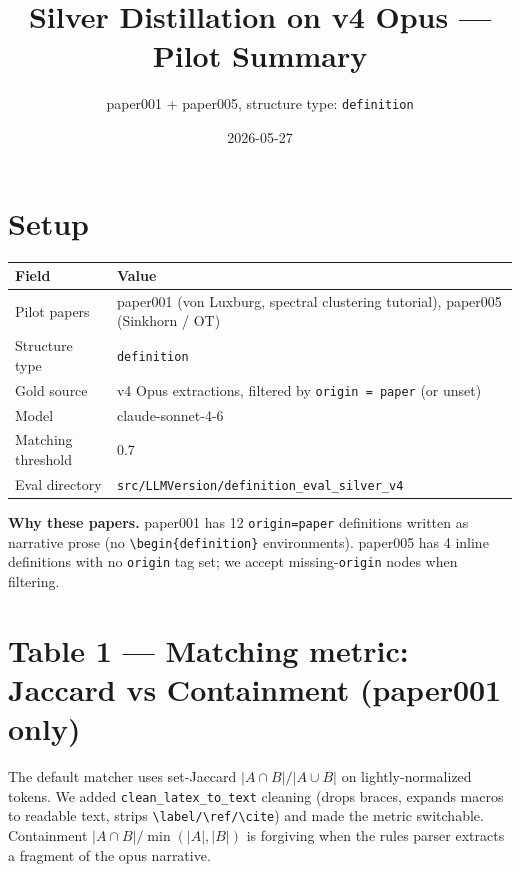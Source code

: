 \documentclass[10pt]{article}
\title{\vspace{-2em}Silver Distillation on v4 Opus --- Pilot Summary}
\author{paper001 + paper005, structure type: \texttt{definition}}
\date{2026-05-27}
\begin{document}
\maketitle
\vspace{-1.5em}

\section*{Setup}
\noindent
\begin{tabular}{ll}
\toprule
\textbf{Field} & \textbf{Value} \\
\midrule
Pilot papers       & paper001 (von Luxburg, spectral clustering tutorial), paper005 (Sinkhorn / OT) \\
Structure type     & \texttt{definition} \\
Gold source        & v4 Opus extractions, filtered by \texttt{origin = paper} (or unset) \\
Model              & claude-sonnet-4-6 \\
Matching threshold & 0.7 \\
Eval directory     & \texttt{src/LLMVersion/definition\_eval\_silver\_v4} \\
\bottomrule
\end{tabular}

\bigskip
\noindent
{\small \textbf{Why these papers.} paper001 has 12 \texttt{origin=paper} definitions written as narrative prose (no \texttt{\textbackslash begin\{definition\}} environments). paper005 has 4 inline definitions with no \texttt{origin} tag set; we accept missing-\texttt{origin} nodes when filtering.}

\section*{Table 1 --- Matching metric: Jaccard vs Containment (paper001 only)}

\noindent
The default matcher uses set-Jaccard $|A \cap B| / |A \cup B|$ on lightly-normalized tokens. We added \texttt{clean\_latex\_to\_text} cleaning (drops braces, expands macros to readable text, strips \texttt{\textbackslash label/\textbackslash ref/\textbackslash cite}) and made the metric switchable. Containment $|A \cap B| / \min(|A|,|B|)$ is forgiving when the rules parser extracts a fragment of the opus narrative.
\end{document}
